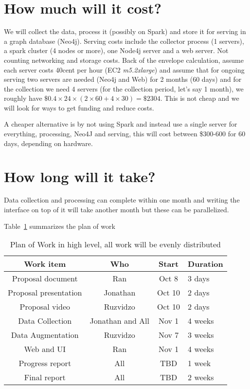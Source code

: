 \documentclass[sigconf,11pt]{acmart}
\begin{document}
\section*{How much will it cost?}
We will collect the data, process it (possibly on Spark) and
store it for serving in a graph database (Neo4j\cite{neo4j}).
Serving costs include the collector process (1 servers), a spark cluster (4 nodes or more),
one Node4j server and a web server.
Not counting networking and storage costs.
Back of the envelope calculation, assume each server costs 40cent per hour (EC2 \emph{m5.2xlarge})
and assume that for ongoing serving two servers are needed (Neo4j and Web) for 2 months (60 days)
and for the collection we need 4 servers (for the collection period, let's say 1 month),
we roughly have $\$0.4 \times 24 \times (2 \times 60 + 4 \times 30) = \$2304$.
This is not cheap and we will look for ways to get funding and reduce costs.

A cheaper alternative is by not using Spark and instead use a single server for everything,
processing, Neo4J and serving, this will cost between \$300-600 for 60 days, depending on hardware.

\section*{How long will it take?}
Data collection and processing can complete within one month and writing the interface on top of it will take another month
but these can be parallelized.

Table~\ref{tab:pow} summarizes the plan of work
\begin{table}
  \caption{Plan of Work in high level, all work will be evenly distributed}
  \label{tab:pow}
  \begin{tabular}{cccl}
    \toprule
    Work item               & Who                         & Start   &  Duration\\
    \midrule
    Proposal document       & Ran               & Oct 8   & 3 days \\
    Proposal presentation   & Jonathan          & Oct 10  & 2 days \\
    Proposal video          & Ruzvidzo          & Oct 10  & 2 days \\
    Data Collection         & Jonathan and All  & Nov 1   & 4 weeks \\
    Data Augmentation       & Ruzvidzo          & Nov 7   & 3 weeks \\
    Web and UI              & Ran               & Nov 1   & 4 weeks\\
    Progress report         & All               & TBD     & 1 week \\
    Final report            & All               & TBD     & 2 weeks \\
  \bottomrule
\end{tabular}
\end{table}
\end{document}
